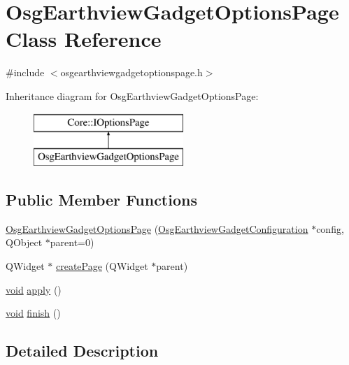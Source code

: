 \hypertarget{class_osg_earthview_gadget_options_page}{\section{\-Osg\-Earthview\-Gadget\-Options\-Page \-Class \-Reference}
\label{class_osg_earthview_gadget_options_page}
}


{\ttfamily \#include $<$osgearthviewgadgetoptionspage.\-h$>$}

\-Inheritance diagram for \-Osg\-Earthview\-Gadget\-Options\-Page\-:\begin{figure}[H]
\begin{center}
\leavevmode
\includegraphics[height=2.000000cm]{class_osg_earthview_gadget_options_page}
\end{center}
\end{figure}
\subsection*{\-Public \-Member \-Functions}
\begin{DoxyCompactItemize}
\item 
\hyperlink{group___o_s_g_earth_view_pluging_gae7d8f2c382b21dd6d913abc3a5b3354a}{\-Osg\-Earthview\-Gadget\-Options\-Page} (\hyperlink{class_osg_earthview_gadget_configuration}{\-Osg\-Earthview\-Gadget\-Configuration} $\ast$config, \-Q\-Object $\ast$parent=0)
\item 
\-Q\-Widget $\ast$ \hyperlink{group___o_s_g_earth_view_pluging_gab3f0d2eb9fbf4dca4dcdb6b20c70eb52}{create\-Page} (\-Q\-Widget $\ast$parent)
\item 
\hyperlink{group___u_a_v_objects_plugin_ga444cf2ff3f0ecbe028adce838d373f5c}{void} \hyperlink{group___o_s_g_earth_view_pluging_ga1c8c1c8cba26cf60acc0c25bbd8b0d23}{apply} ()
\item 
\hyperlink{group___u_a_v_objects_plugin_ga444cf2ff3f0ecbe028adce838d373f5c}{void} \hyperlink{group___o_s_g_earth_view_pluging_gaa2fbdbeced73248edc1b001ba9294684}{finish} ()
\end{DoxyCompactItemize}


\subsection{\-Detailed \-Description}



